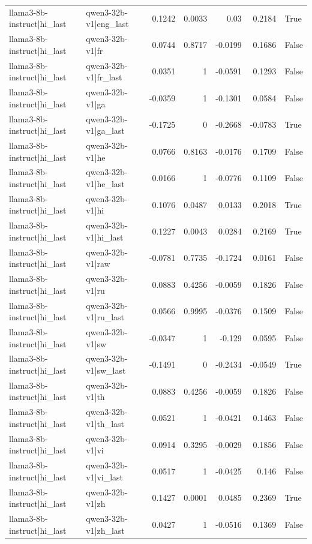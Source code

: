 \begin{table}
\begin{tabular}{l l r r r r l}
llama3-8b-instruct|hi_last & qwen3-32b-v1|eng_last & 0.1242 & 0.0033 & 0.03 & 0.2184 & True \\
llama3-8b-instruct|hi_last & qwen3-32b-v1|fr & 0.0744 & 0.8717 & -0.0199 & 0.1686 & False \\
llama3-8b-instruct|hi_last & qwen3-32b-v1|fr_last & 0.0351 & 1 & -0.0591 & 0.1293 & False \\
llama3-8b-instruct|hi_last & qwen3-32b-v1|ga & -0.0359 & 1 & -0.1301 & 0.0584 & False \\
llama3-8b-instruct|hi_last & qwen3-32b-v1|ga_last & -0.1725 & 0 & -0.2668 & -0.0783 & True \\
llama3-8b-instruct|hi_last & qwen3-32b-v1|he & 0.0766 & 0.8163 & -0.0176 & 0.1709 & False \\
llama3-8b-instruct|hi_last & qwen3-32b-v1|he_last & 0.0166 & 1 & -0.0776 & 0.1109 & False \\
llama3-8b-instruct|hi_last & qwen3-32b-v1|hi & 0.1076 & 0.0487 & 0.0133 & 0.2018 & True \\
llama3-8b-instruct|hi_last & qwen3-32b-v1|hi_last & 0.1227 & 0.0043 & 0.0284 & 0.2169 & True \\
llama3-8b-instruct|hi_last & qwen3-32b-v1|raw & -0.0781 & 0.7735 & -0.1724 & 0.0161 & False \\
llama3-8b-instruct|hi_last & qwen3-32b-v1|ru & 0.0883 & 0.4256 & -0.0059 & 0.1826 & False \\
llama3-8b-instruct|hi_last & qwen3-32b-v1|ru_last & 0.0566 & 0.9995 & -0.0376 & 0.1509 & False \\
llama3-8b-instruct|hi_last & qwen3-32b-v1|sw & -0.0347 & 1 & -0.129 & 0.0595 & False \\
llama3-8b-instruct|hi_last & qwen3-32b-v1|sw_last & -0.1491 & 0 & -0.2434 & -0.0549 & True \\
llama3-8b-instruct|hi_last & qwen3-32b-v1|th & 0.0883 & 0.4256 & -0.0059 & 0.1826 & False \\
llama3-8b-instruct|hi_last & qwen3-32b-v1|th_last & 0.0521 & 1 & -0.0421 & 0.1463 & False \\
llama3-8b-instruct|hi_last & qwen3-32b-v1|vi & 0.0914 & 0.3295 & -0.0029 & 0.1856 & False \\
llama3-8b-instruct|hi_last & qwen3-32b-v1|vi_last & 0.0517 & 1 & -0.0425 & 0.146 & False \\
llama3-8b-instruct|hi_last & qwen3-32b-v1|zh & 0.1427 & 0.0001 & 0.0485 & 0.2369 & True \\
llama3-8b-instruct|hi_last & qwen3-32b-v1|zh_last & 0.0427 & 1 & -0.0516 & 0.1369 & False \\

\end{tabular}
\end{table}
